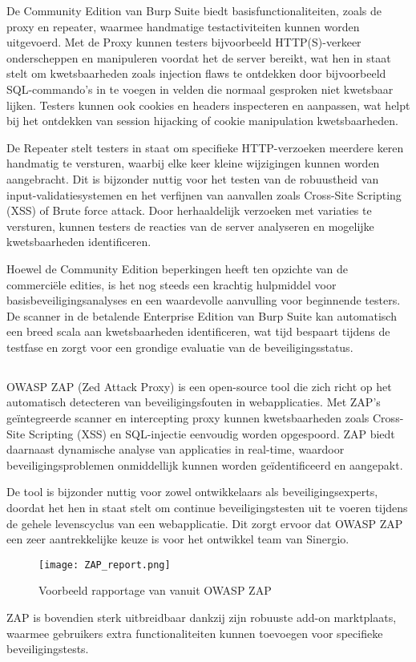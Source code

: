 De Community Edition van Burp Suite biedt basisfunctionaliteiten, zoals de proxy en repeater, 
waarmee handmatige testactiviteiten kunnen worden uitgevoerd. Met de Proxy kunnen testers bijvoorbeeld HTTP(S)-verkeer 
onderscheppen en manipuleren voordat het de server bereikt, wat hen in staat stelt om kwetsbaarheden zoals injection flaws 
te ontdekken door bijvoorbeeld SQL-commando's in te voegen in velden die normaal gesproken niet kwetsbaar lijken. Testers 
kunnen ook cookies en headers inspecteren en aanpassen, wat helpt bij het ontdekken van session hijacking of cookie 
manipulation kwetsbaarheden.

De Repeater stelt testers in staat om specifieke HTTP-verzoeken meerdere keren handmatig te versturen, waarbij elke keer 
kleine wijzigingen kunnen worden aangebracht. Dit is bijzonder nuttig voor het testen van de robuustheid van 
input-validatiesystemen en het verfijnen van aanvallen zoals Cross-Site Scripting (XSS) of Brute force attack. Door 
herhaaldelijk verzoeken met variaties te versturen, kunnen testers de reacties van de server analyseren en mogelijke 
kwetsbaarheden identificeren.

Hoewel de Community Edition beperkingen heeft ten opzichte van de 
commerciële edities, is het nog steeds een krachtig hulpmiddel voor basisbeveiligingsanalyses en een waardevolle aanvulling 
voor beginnende testers. De scanner in de betalende Enterprise Edition van Burp Suite kan automatisch een breed scala aan kwetsbaarheden 
identificeren, wat tijd bespaart tijdens de testfase en zorgt voor een grondige evaluatie van de beveiligingsstatus.

\subsection{}
OWASP ZAP (Zed Attack Proxy) is een open-source tool die zich richt op het automatisch detecteren van beveiligingsfouten in 
webapplicaties. Met ZAP's geïntegreerde scanner en intercepting proxy kunnen 
kwetsbaarheden zoals Cross-Site Scripting (XSS) en SQL-injectie eenvoudig worden opgespoord. ZAP biedt 
daarnaast dynamische analyse van applicaties in real-time, waardoor beveiligingsproblemen onmiddellijk kunnen worden geïdentificeerd 
en aangepakt.

De tool is bijzonder nuttig voor zowel ontwikkelaars als beveiligingsexperts, doordat het hen in staat stelt 
om continue beveiligingstesten uit te voeren tijdens de gehele levenscyclus van een webapplicatie. Dit zorgt ervoor dat 
OWASP ZAP een zeer aantrekkelijke keuze is voor het ontwikkel team van Sinergio.
\begin{figure}
    \centering
    \texttt{[image: ZAP\_report.png]}
    \caption[Voorbeeld rapportage van vanuit OWASP ZAP]{Voorbeeld rapportage van vanuit OWASP ZAP}
    \label{fig:zap_report}
\end{figure}
ZAP is bovendien sterk uitbreidbaar dankzij zijn robuuste add-on marktplaats, waarmee gebruikers extra functionaliteiten 
kunnen toevoegen voor specifieke beveiligingstests. 

